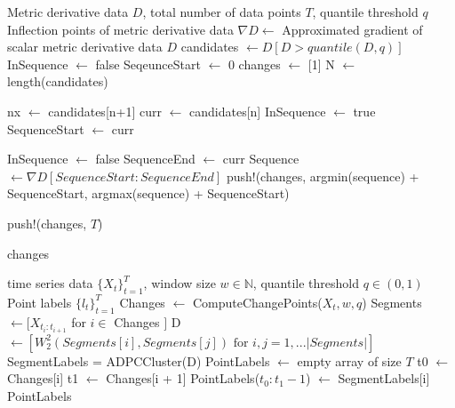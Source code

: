 \documentclass{article}
\begin{document}
\iffalse
\begin{algorithm}
\label{IPIDAlg}
\caption{Change Point Detection Subroutine: Identifying Inflection Points}
\begin{algorithmic}[2]
\Require Metric derivative data $D$, total number of data points $T$, quantile threshold $q$
\Ensure Inflection points of metric derivative data
\State $\nabla D \gets$ Approximated gradient of scalar metric derivative data \(D\)
\State candidates $\gets D[D > quantile(D, q)]$ 
\State InSequence $\gets$ false
\State SeqeunceStart $\gets$ 0
\State changes $\gets$ [1]
\State N $\gets$ length(candidates)

\State     nx $\gets$ candidates[n+1]
\State     curr $\gets$ candidates[n]
\State  InSequence $\gets$ true
\State  SequenceStart $\gets$ curr
\EndIf

\State        InSequence $\gets$ false
\State        SequenceEnd $\gets$ curr
\State        Sequence $\gets \nabla D[SequenceStart:SequenceEnd]$
\State        push!(changes, argmin(sequence) + SequenceStart, argmax(sequence) + SequenceStart)
\EndIf

\EndFor

\State    push!(changes, $T$)

\State \Return changes
\end{algorithmic}
\end{algorithm}

\begin{algorithm}
\label{GeneralStepAlg}
\caption{Metastable State Identification Procedure (IdentifyStates)}
\begin{algorithmic}[3]
\Require time series data \(\{X_t\}_{t=1}^{T}\), window size $w \in \mathbb{N}$, quantile threshold $q \in (0,1)$
\Ensure Point labels \(\{l_t\}_{t=1}^{T}\)
\State Changes $\gets$ ComputeChangePoints($X_t, w, q$)
\State Segments $\gets [X_{t_i:t_{i+1}}$ for $i \in $ Changes $]$
\State D $\gets [W_2^2(Segments[i], Segments[j]) \text{ for } i,j = 1, ... |Segments|]$
\State SegmentLabels = ADPCCluster(D) 
\State PointLabels $\gets$ empty array of size $T$
\State t0 $\gets$ Changes[i]
\State t1 $\gets$ Changes[i + 1]
\State PointLabels($t_0:t_1-1$) $\gets$ SegmentLabels[i]
\EndFor
\State \Return PointLabels
\end{algorithmic}
\end{algorithm}
\end{document}

